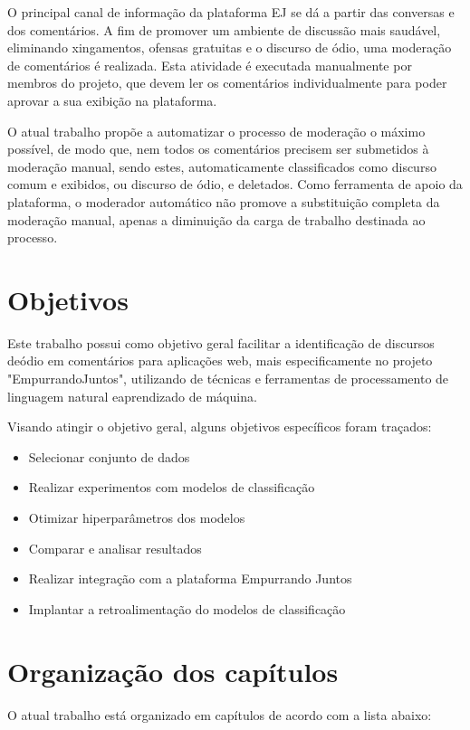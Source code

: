 O principal canal de informação da plataforma EJ se dá a partir das conversas e dos comentários. A fim de promover um ambiente de discussão mais saudável, eliminando xingamentos, ofensas gratuitas e o discurso de ódio, uma moderação de comentários é realizada. Esta atividade é executada manualmente por membros do projeto, que devem ler os comentários individualmente para poder aprovar a sua exibição na plataforma.

O atual trabalho propõe a automatizar o processo de moderação o máximo possível, de modo que, nem todos os comentários precisem ser submetidos à moderação manual, sendo estes, automaticamente classificados como discurso comum e exibidos, ou discurso de ódio, e deletados. Como ferramenta de apoio da plataforma, o moderador automático não promove a substituição completa da moderação manual, apenas a diminuição da carga de trabalho destinada ao processo.

\section[Objetivos]{Objetivos}

Este trabalho possui como objetivo geral facilitar a identificação de discursos deódio em comentários para aplicações web, mais especificamente no projeto "EmpurrandoJuntos", utilizando de técnicas e ferramentas de processamento de linguagem natural eaprendizado de máquina.

Visando atingir o objetivo geral, alguns objetivos específicos foram traçados:

\begin{itemize}
\item Selecionar conjunto de dados
\item Realizar experimentos com modelos de classificação
\item Otimizar hiperparâmetros dos modelos
\item Comparar e analisar resultados
\item Realizar integração com a plataforma Empurrando Juntos
\item Implantar a retroalimentação do modelos de classificação
\end{itemize}

\section[Organização dos capítulos]{Organização dos capítulos}

O atual trabalho está organizado em capítulos de acordo com a lista abaixo:

